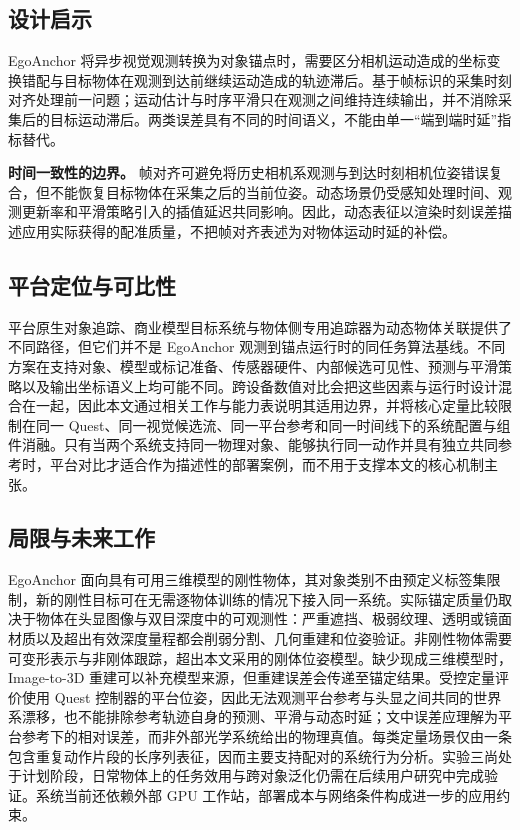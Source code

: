 \documentclass[review]{vgtc}
\begin{document}
\subsection{设计启示}


EgoAnchor 将异步视觉观测转换为对象锚点时，需要区分相机运动造成的坐标变换错配与目标物体在观测到达前继续运动造成的轨迹滞后。基于帧标识的采集时刻对齐处理前一问题；运动估计与时序平滑只在观测之间维持连续输出，并不消除采集后的目标运动滞后。两类误差具有不同的时间语义，不能由单一“端到端时延”指标替代。

\textbf{时间一致性的边界。} 帧对齐可避免将历史相机系观测与到达时刻相机位姿错误复合，但不能恢复目标物体在采集之后的当前位姿。动态场景仍受感知处理时间、观测更新率和平滑策略引入的插值延迟共同影响。因此，动态表征以渲染时刻误差描述应用实际获得的配准质量，不把帧对齐表述为对物体运动时延的补偿。

\subsection{平台定位与可比性}

平台原生对象追踪、商业模型目标系统与物体侧专用追踪器为动态物体关联提供了不同路径，但它们并不是 EgoAnchor 观测到锚点运行时的同任务算法基线。不同方案在支持对象、模型或标记准备、传感器硬件、内部候选可见性、预测与平滑策略以及输出坐标语义上均可能不同。跨设备数值对比会把这些因素与运行时设计混合在一起，因此本文通过相关工作与能力表说明其适用边界，并将核心定量比较限制在同一 Quest、同一视觉候选流、同一平台参考和同一时间线下的系统配置与组件消融。只有当两个系统支持同一物理对象、能够执行同一动作并具有独立共同参考时，平台对比才适合作为描述性的部署案例，而不用于支撑本文的核心机制主张。

\subsection{局限与未来工作}


EgoAnchor 面向具有可用三维模型的刚性物体，其对象类别不由预定义标签集限制，新的刚性目标可在无需逐物体训练的情况下接入同一系统。实际锚定质量仍取决于物体在头显图像与双目深度中的可观测性：严重遮挡、极弱纹理、透明或镜面材质以及超出有效深度量程都会削弱分割、几何重建和位姿验证。非刚性物体需要可变形表示与非刚体跟踪，超出本文采用的刚体位姿模型。缺少现成三维模型时，Image-to-3D 重建可以补充模型来源，但重建误差会传递至锚定结果。受控定量评价使用 Quest 控制器的平台位姿，因此无法观测平台参考与头显之间共同的世界系漂移，也不能排除参考轨迹自身的预测、平滑与动态时延；文中误差应理解为平台参考下的相对误差，而非外部光学系统给出的物理真值。每类定量场景仅由一条包含重复动作片段的长序列表征，因而主要支持配对的系统行为分析。实验三尚处于计划阶段，日常物体上的任务效用与跨对象泛化仍需在后续用户研究中完成验证。系统当前还依赖外部 GPU 工作站，部署成本与网络条件构成进一步的应用约束。
\end{document}
